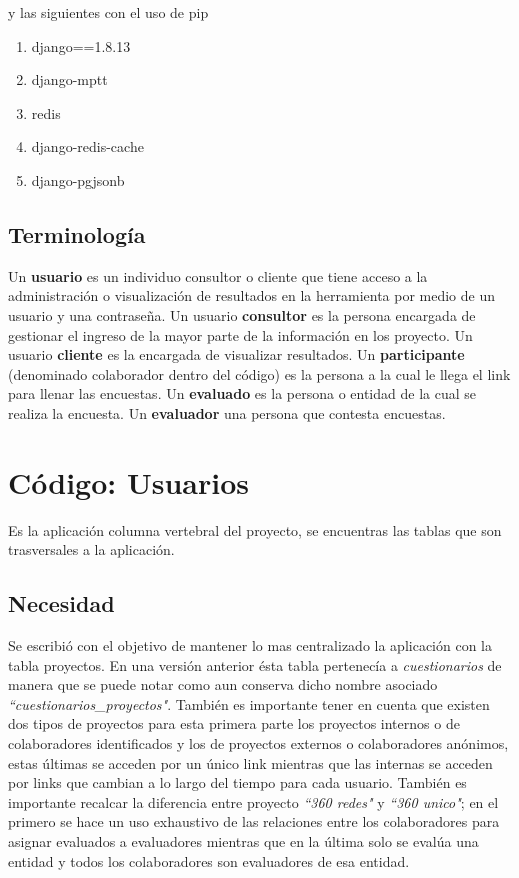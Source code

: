 \documentclass[10pt,a4paper]{book}
\begin{document}
	y las siguientes con el uso de pip
	\begin{enumerate}
		\item django==1.8.13
		\item django-mptt
		\item redis
		\item django-redis-cache
		\item django-pgjsonb
	\end{enumerate}

	\section{Terminología}
	Un \textbf{usuario} es un individuo consultor o cliente que tiene acceso a la administración o visualización de resultados en la herramienta por medio de un usuario y una contraseña. Un usuario \textbf{consultor} es la persona encargada de gestionar el ingreso de la mayor parte de la información en los proyecto. Un usuario \textbf{cliente} es la encargada de visualizar resultados. Un \textbf{participante} (denominado colaborador dentro del código) es la persona a la cual le llega el link para llenar las encuestas. Un \textbf{evaluado} es la persona o entidad de la cual se realiza la encuesta. Un \textbf{evaluador} una persona que contesta encuestas.

	\chapter{Código: Usuarios}

	Es la aplicación columna vertebral del proyecto, se encuentras las tablas que son trasversales a la aplicación.

	\section{Necesidad}

	Se escribió con el objetivo de mantener lo mas centralizado la aplicación con la tabla proyectos. En una versión anterior ésta tabla pertenecía a \textit{cuestionarios} de manera que se puede notar como aun conserva dicho nombre asociado \textit{``cuestionarios\_proyectos"}. También es importante tener en cuenta que existen dos tipos de proyectos para esta primera parte los proyectos internos o de colaboradores identificados y los de proyectos externos o colaboradores anónimos, estas últimas se acceden por un único link mientras que las internas se acceden por links que cambian a lo largo del tiempo para cada usuario. También es importante recalcar la diferencia entre proyecto \textit{``360 redes"} y \textit{``360 unico"}; en el primero se hace un uso exhaustivo de las relaciones entre los colaboradores para asignar evaluados a evaluadores mientras que en la última solo se evalúa una entidad y todos los colaboradores son evaluadores de esa entidad.
\end{document}
